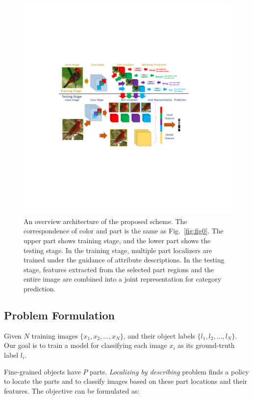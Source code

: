 \documentclass{article}
\begin{document}
\begin{figure}[!t]
\begin{center}
\includegraphics[scale = 0.3]{1.pdf}
\end{center}
\caption{An overview architecture of the proposed scheme. The correspondence of color and part is the same as Fig.~\ref{fig:fig0}.
The upper part shows training stage, and the lower part shows the testing stage. In the training stage, multiple part localizers are trained under the guidance of attribute descriptions.
In the testing stage, features extracted from the selected part regions and the entire image are combined into a joint representation for category prediction.
}\label{fig:fig1}
\end{figure}


\subsection{Problem Formulation}
Given $N$ training images $\{x_1, x_2, \dots  , x_N\}$, and their object labels $\{l_1, l_2, \dots, l_N \}$. Our goal is to train a model for classifying each image $x_i$ as its ground-truth label $l_i$.

Fine-grained objects have $P$ parts. \emph{Localizing by describing} problem finds a policy to locate the parts and to classify images based on these part locations and their features. The objective can be formulated as:
\end{document}
